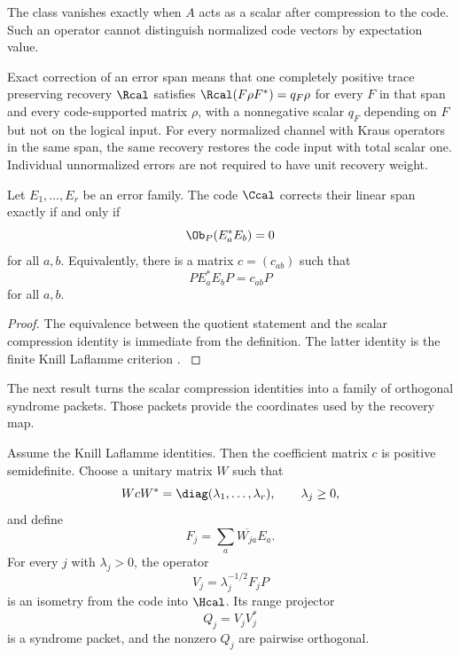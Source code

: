 The class vanishes exactly when \(A\) acts as a scalar after compression to the code. Such an operator cannot distinguish normalized code vectors by expectation value.

Exact correction of an error span means that one completely positive trace preserving recovery $\Rcal$ satisfies $\Rcal(F\rho F^*)=q_F\rho$ for every $F$ in that span and every code-supported matrix $\rho$, with a nonnegative scalar $q_F$ depending on $F$ but not on the logical input. For every normalized channel with Kraus operators in the same span, the same recovery restores the code input with total scalar one. Individual unnormalized errors are not required to have unit recovery weight.

\begin{theorem}\label{strong:theorem:026}\label{strong:thm:kl_obstruction}
Let \(E_1,\ldots,E_r\) be an error family. The code \(\Ccal\) corrects their linear span exactly if and only if
\[
\Ob_P(E_a^*E_b)=0
\]
for all \(a,b\). Equivalently, there is a matrix \(c=(c_{ab})\) such that
\[
PE_a^*E_bP=c_{ab}P
\]
for all \(a,b\).
\end{theorem}

\begin{proof}\label{strong:proof:039}
The equivalence between the quotient statement and the scalar compression identity is immediate from the definition. The latter identity is the finite Knill Laflamme criterion \cite{KnillLaflamme1997,SchumacherNielsen1996}.
\label{strong:proof:039:end}\end{proof}

The next result turns the scalar compression identities into a family of orthogonal syndrome packets. Those packets provide the coordinates used by the recovery map.

\begin{theorem}\label{strong:theorem:027}\label{strong:thm:syndrome_construction}
Assume the Knill Laflamme identities. Then the coefficient matrix \(c\) is positive semidefinite. Choose a unitary matrix \(W\) such that
\[
WcW^*=\diag(\lambda_1,\ldots,\lambda_r),
\qquad
\lambda_j\geq0,
\]
and define
\[
F_j=\sum_a\overline{W_{ja}}E_a.
\]
For every \(j\) with \(\lambda_j>0\), the operator
\[
V_j=\lambda_j^{-1/2}F_jP
\]
is an isometry from the code into \(\Hcal\). Its range projector
\[
Q_j=V_jV_j^*
\]
is a syndrome packet, and the nonzero \(Q_j\) are pairwise orthogonal.
\end{theorem}


